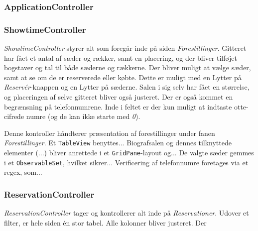 \subsubsection{ApplicationController}


\subsubsection{ShowtimeController}

\textit{ShowtimeController} styrer alt som foregår inde på siden \textit{Forestillinger}. Gitteret har fået et antal af sæder og rækker, samt en placering, og der bliver tilføjet bogstaver og tal til både sæderne og rækkerne. Der bliver muligt at vælge sæder, samt at se om de er reserverede eller købte. Dette er muligt med en Lytter på \textit{Reservér}-knappen og en Lytter på sæderne. Salen i sig selv har fået en størrelse, og placeringen af selve gitteret bliver også justeret. Der er også kommet en begrænsning på telefonnumrene. Inde i feltet er der kun muligt at indtaste otte-cifrede numre (og de kan ikke starte med \textit{0}).

Denne kontroller håndterer præsentation af forestillinger under fanen \textit{Forestillinger}. Et \texttt{TableView} benyttes... Biografsalen og dennes tilknyttede elementer (...) bliver anrettede i et \texttt{GridPane}-layout og... De valgte sæder gemmes i et \texttt{ObservableSet}, hvilket sikrer... Verificering af telefonnumre foretages via et regex, som... 
  
\subsubsection{ReservationController}

\textit{ReservationController} tager og kontrollerer alt inde på \textit{Reservationer}. Udover et filter, er hele siden én stor tabel. Alle kolonner bliver justeret. Der 